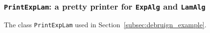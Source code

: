 
\subsubsection{\lstinline{PrintExpLam}: a pretty printer for \lstinline{ExpAlg} and \lstinline{LamAlg}}\label{subsec:appendix_printer}

The class \lstinline{PrintExpLam} used in Section~\ref{subsec:debruign_example}.


